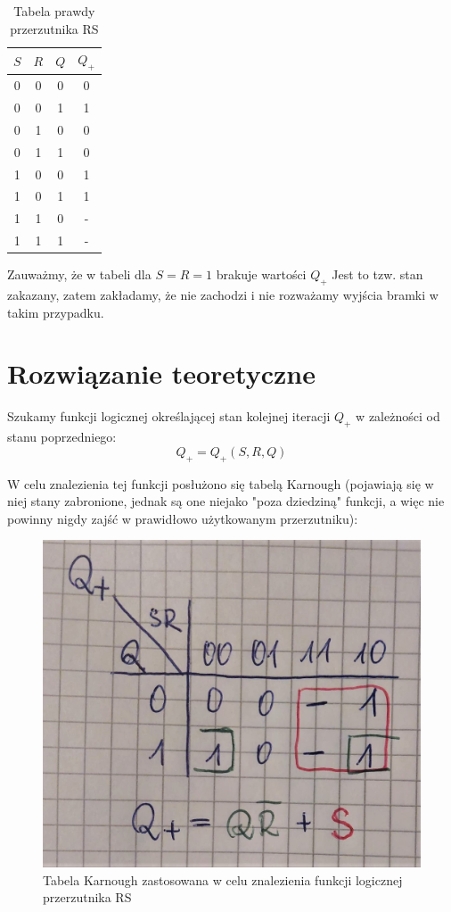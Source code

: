 \documentclass[12pt,a4paper,openright]{mwrep}
\begin{document}
\begin{table}[h]
    \centering
    \begin{tabular}{|ccc|c|}
        \hline
        $S$ & $R$ & $Q$ & $Q_+$ \\
        \hline
        0   & 0   & 0   & 0     \\
        0   & 0   & 1   & 1     \\
        \hline
        0   & 1   & 0   & 0     \\
        0   & 1   & 1   & 0     \\
        \hline
        1   & 0   & 0   & 1     \\
        1   & 0   & 1   & 1    \\
        \hline
        1   & 1   & 0   & -     \\
        1   & 1   & 1   & -    \\
        \hline
    \end{tabular}
    \caption{Tabela prawdy przerzutnika RS}
    \label{tab:rs_truthtable}
\end{table}

Zauważmy, że w tabeli dla $S = R = 1$ brakuje wartości $Q_+$
Jest to tzw. stan zakazany, zatem zakładamy, że nie zachodzi i nie rozważamy
wyjścia bramki w takim przypadku.

\section{Rozwiązanie teoretyczne}

Szukamy funkcji logicznej określającej stan kolejnej iteracji $Q_+$ w zależności od stanu poprzedniego:
\begin{equation}
    Q_+ = Q_+(S, R, Q)
\end{equation}

W celu znalezienia tej funkcji posłużono się tabelą Karnough 
(pojawiają się w niej stany zabronione, jednak
są one niejako "poza dziedziną" funkcji, a
więc nie powinny nigdy zajść w prawidłowo użytkowanym przerzutniku):

\begin{figure}[H]
    \centering
    \includegraphics[width=0.3\linewidth]{images/rs_karnough.jpg}
    \caption{Tabela Karnough zastosowana w celu znalezienia funkcji logicznej przerzutnika RS}
    \label{fig:rs_karnough}
\end{figure}
\end{document}
